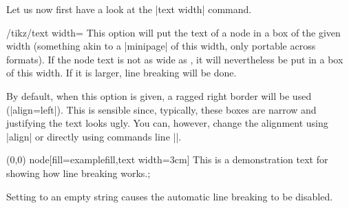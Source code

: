 Let us now first have a look at the |text width| command.
\begin{key}{/tikz/text width=}
  This option will put the text of a node in a box of the given width
  (something akin to a |{minipage}| of this width, only portable
  across formats). If the node text is not as wide as
  , it will nevertheless be put in a box of this
  width. If it is larger, line breaking will be done.

  By default, when this option is given, a ragged right border will be
  used (|align=left|). This is sensible since, typically, these boxes
  are narrow and justifying the text looks ugly. You can, however,
  change the alignment using |align| or directly using commands line
  |\centering|.
\begin{codeexample}[]
\tikz \draw (0,0) node[fill=examplefill,text width=3cm]
  {This is a demonstration text for showing how line breaking works.};
\end{codeexample}
  Setting  to an empty string causes the automatic
  line breaking to be disabled.
\end{key}


